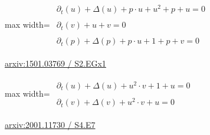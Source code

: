 \documentclass[10pt,a4paper]{article}
\begin{document}
\begin{minipage}{\linewidth}
\begin{center}\begin{adjustbox}{max width=\linewidth}$\displaystyle\begin{gathered}\begin{gathered}\partial_{t}(u)+\Delta(u)+p\cdot u+u^{2}+p+u=0\end{gathered}\\[5pt]\begin{gathered}\partial_{t}(v)+u+v=0\end{gathered}\\[5pt]\begin{gathered}\partial_{t}(p)+\Delta(p)+p\cdot u+1+p+v=0\end{gathered}\end{gathered}$\end{adjustbox}\end{center}
{\small \href{https://arxiv.org/html/1501.03769#S2.EGx1}{arxiv:1501.03769 / S2.EGx1}}\par
\end{minipage}\par\vspace{7mm}

\begin{minipage}{\linewidth}
\begin{center}\begin{adjustbox}{max width=\linewidth}$\displaystyle\begin{gathered}\begin{gathered}\partial_{t}(u)+\Delta(u)+u^{2}\cdot v+1+u=0\end{gathered}\\[5pt]\begin{gathered}\partial_{t}(v)+\Delta(v)+u^{2}\cdot v+u=0\end{gathered}\end{gathered}$\end{adjustbox}\end{center}
{\small \href{https://arxiv.org/html/2001.11730#S4.E7}{arxiv:2001.11730 / S4.E7}}\par
\end{minipage}\par\vspace{7mm}
\end{document}
